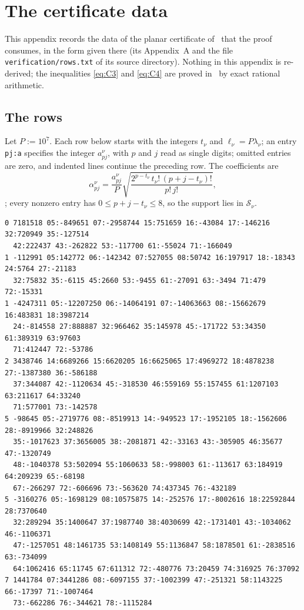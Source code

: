 \section{The certificate data}\label{app:certificate}

This appendix records the data of the planar certificate
of~\cite{OAI:A-Fock-space-inequality-and-the-Laughlin-spectral-gap-September-24-2026} that the proof consumes, in the form given
there (its Appendix~A and the file \texttt{verification/rows.txt} of its source directory). Nothing in this appendix is re-derived;
the inequalities \eqref{eq:C3} and \eqref{eq:C4} are proved in~\cite[Appendix~A]{OAI:A-Fock-space-inequality-and-the-Laughlin-spectral-gap-September-24-2026}
by exact rational arithmetic.

\subsection{The rows}

Let $P:=10^7$. Each row below starts with the integers $t_\nu$ and $\ell_\nu=P\lambda_\nu$; an entry \texttt{pj:a} specifies the
integer $a^\nu_{pj}$, with $p$ and $j$ read as single digits; omitted entries are zero, and indented lines continue the
preceding row. The coefficients are
\begin{equation}\label{eq:alphadata}
\alpha^\nu_{pj}=\frac{a^\nu_{pj}}P\sqrt{\frac{2^{p-t_\nu}\,t_\nu!\,(p+j-t_\nu)!}{p!\,j!}} ,
\end{equation}
\cite[Appendix~A.1, (39)]{OAI:A-Fock-space-inequality-and-the-Laughlin-spectral-gap-September-24-2026}; every nonzero entry has
$0\le p+j-t_\nu\le8$, so the support lies in $\mathcal S_\nu$.
{\footnotesize
\begin{verbatim}
0 7181518 05:-849651 07:-2958744 15:751659 16:-43084 17:-146216 32:720949 35:-127514
  42:222437 43:-262822 53:-117700 61:-55024 71:-166049
1 -112991 05:142772 06:-142342 07:527055 08:50742 16:197917 18:-18343 24:5764 27:-21183
  32:75832 35:-6115 45:2660 53:-9455 61:-27091 63:-3494 71:479 72:-15331
1 -4247311 05:-12207250 06:-14064191 07:-14063663 08:-15662679 16:483831 18:3987214
  24:-814558 27:888887 32:966462 35:145978 45:-171722 53:34350 61:389319 63:97603
  71:412447 72:-53786
2 3438746 14:6689266 15:6620205 16:6625065 17:4969272 18:4878238 27:-1387380 36:-586188
  37:344087 42:-1120634 45:-318530 46:559169 55:157455 61:1207103 63:211617 64:33240
  71:577001 73:-142578
5 -98645 05:-2719776 08:-8519913 14:-949523 17:-1952105 18:-1562606 28:-8919966 32:248826
  35:-1017623 37:3656005 38:-2081871 42:-33163 43:-305905 46:35677 47:-1320749
  48:-1040378 53:502094 55:1060633 58:-998003 61:-113617 63:184919 64:209239 65:-68198
  67:-266297 72:-606696 73:-563620 74:437345 76:-432189
5 -3160276 05:-1698129 08:10575875 14:-252576 17:-8002616 18:22592844 28:7370640
  32:289294 35:1400647 37:1987740 38:4030699 42:-1731401 43:-1034062 46:-1106371
  47:-1257051 48:1461735 53:1408149 55:1136847 58:1878501 61:-2838516 63:-734099
  64:1062416 65:11745 67:611312 72:-480776 73:20459 74:316925 76:37092
7 1441784 07:3441286 08:-6097155 37:-1002399 47:-251321 58:1143225 66:-17397 71:-1007464
  73:-662286 76:-344621 78:-1115284
\end{verbatim}
}

